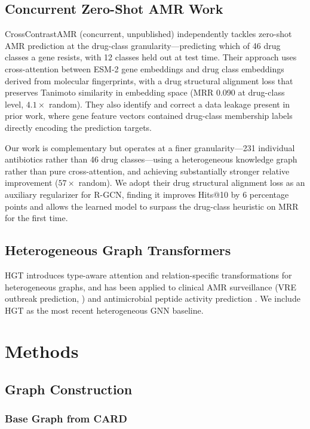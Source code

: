 \documentclass[conference]{IEEEtran}
\begin{document}
\subsection{Concurrent Zero-Shot AMR Work}

CrossContrastAMR (concurrent, unpublished) independently tackles zero-shot AMR prediction at the drug-class granularity---predicting which of 46 drug classes a gene resists, with 12 classes held out at test time. Their approach uses cross-attention between ESM-2 gene embeddings and drug class embeddings derived from molecular fingerprints, with a drug structural alignment loss that preserves Tanimoto similarity in embedding space (MRR 0.090 at drug-class level, $4.1\times$ random). They also identify and correct a data leakage present in prior work, where gene feature vectors contained drug-class membership labels directly encoding the prediction targets.

Our work is complementary but operates at a finer granularity---231 individual antibiotics rather than 46 drug classes---using a heterogeneous knowledge graph rather than pure cross-attention, and achieving substantially stronger relative improvement ($57\times$ random). We adopt their drug structural alignment loss as an auxiliary regularizer for R-GCN, finding it improves Hits@10 by 6 percentage points and allows the learned model to surpass the drug-class heuristic on MRR for the first time.

\subsection{Heterogeneous Graph Transformers}

HGT \cite{hu2020hgt} introduces type-aware attention and relation-specific transformations for heterogeneous graphs, and has been applied to clinical AMR surveillance (VRE outbreak prediction, \cite{vre2025}) and antimicrobial peptide activity prediction \cite{amphgt2025}. We include HGT as the most recent heterogeneous GNN baseline.

\section{Methods}

\subsection{Graph Construction}

\subsubsection{Base Graph from CARD}
\end{document}
